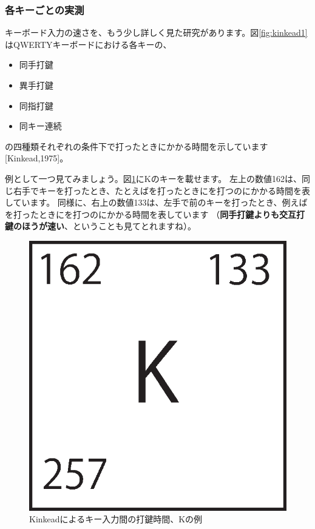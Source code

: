 \subsubsection{各キーごとの実測}

キーボード入力の速さを、もう少し詳しく見た研究があります。図\ref{fig:kinkead1}はQWERTYキーボードにおける各キーの、
\begin{itemize}
 \item 同手打鍵
 \item 異手打鍵
 \item 同指打鍵
 \item 同キー連続
\end{itemize}
の四種類それぞれの条件下で打ったときにかかる時間を示しています[Kinkead,1975]。

例として一つ見てみましょう。図\ref{fig:kinkead_k}にKのキーを載せます。
左上の数値162は、同じ右手でキーを打ったとき、たとえばを打ったときにを打つのにかかる時間を表しています。
同様に、右上の数値133は、左手で前のキーを打ったとき、例えばを打ったときにを打つのにかかる時間を表しています
（{\bf 同手打鍵よりも交互打鍵のほうが速い}、ということも見てとれますね）。

\begin{figure}[tbp]
 \begin{center}
  \includegraphics[width=0.15\hsize]{kinkead2.eps}
 \end{center}
 \caption{Kinkeadによるキー入力間の打鍵時間、Kの例}
 \label{fig:kinkead_k}
\end{figure}

